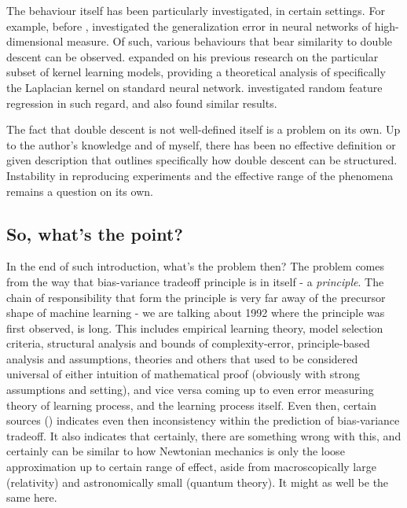 \documentclass[10pt]{article}
\begin{document}
The behaviour itself has been particularly investigated, in certain settings. For example, before \cite{belkin_reconciling_2019}, \cite{advani2017highdimensionaldynamicsgeneralizationerror} investigated the generalization error in neural networks of high-dimensional measure. Of such, various behaviours that bear similarity to double descent can be observed. \cite{belkin2018understanddeeplearningneed} expanded on his previous research on the particular subset of kernel learning models, providing a theoretical analysis of specifically the Laplacian kernel on standard neural network. \cite{mei2020generalizationerrorrandomfeatures} investigated random feature regression in such regard, and also found similar results. 

The fact that double descent is not well-defined itself is a problem on its own. Up to the author's knowledge and of myself, there has been no effective definition or given description that outlines specifically how double descent can be structured. Instability in reproducing experiments and the effective range of the phenomena remains a question on its own. 

\subsection{So, what's the point?}
In the end of such introduction, what's the problem then? The problem comes from the way that bias-variance tradeoff principle is in itself - a \textit{principle}. The chain of responsibility that form the principle is very far away of the precursor shape of machine learning - we are talking about 1992 where the principle was first observed, is long. This includes empirical learning theory, model selection criteria, structural analysis and bounds of complexity-error, principle-based analysis and assumptions, theories and others that used to be considered universal of either intuition of mathematical proof (obviously with strong assumptions and setting), and vice versa coming up to even error measuring theory of learning process, and the learning process itself. Even then, certain sources (\cite{neal2019biasvariancetradeofftextbooksneed}) indicates even then inconsistency within the prediction of bias-variance tradeoff. It also indicates that certainly, there are something wrong with this, and certainly can be similar to how Newtonian mechanics is only the loose approximation up to certain range of effect, aside from macroscopically large (relativity) and astronomically small (quantum theory). It might as well be the same here. 
\end{document}
